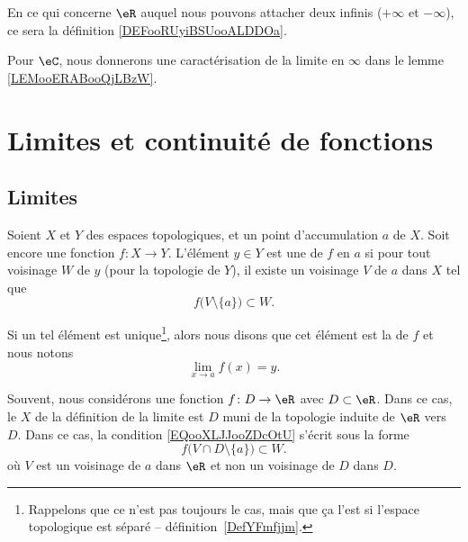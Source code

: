 En ce qui concerne \( \eR\) auquel nous pouvons attacher deux infinis (\( +\infty\) et \( -\infty\)), ce sera la définition \ref{DEFooRUyiBSUooALDDOa}.

Pour \( \eC\), nous donnerons une caractérisation de la limite en \( \infty\) dans le lemme \ref{LEMooERABooQjLBzW}.

\section{Limites et continuité de fonctions}

\subsection{Limites}

\begin{definition}\label{DefYNVoWBx}
    Soient \( X\) et \( Y\) des espaces topologiques, et un point d'accumulation \( a\) de \( X\). Soit encore une fonction \( f\colon X\to Y\). L'élément \( y\in Y\) est une  de \( f\) en \( a\) si pour tout voisinage \( W\) de \( y\) (pour la topologie de \( Y\)), il existe un voisinage \( V\) de \( a\) dans \( X\) tel que
    \begin{equation}        \label{EQooXLJJooZDcOtU}
        f\big( V\setminus\{a\} \big)\subset W.
    \end{equation}

    Si un tel élément est unique\footnote{Rappelons que ce n'est pas toujours le cas, mais que ça l'est si l'espace topologique est séparé -- définition~\ref{DefYFmfjjm}.}, alors nous disons que cet élément est la  de \( f\) et nous notons
    \begin{equation}
        \lim_{x\to a} f(x)=y.
    \end{equation}
\end{definition}

\begin{normaltext}
    Souvent, nous considérons une fonction \( f\colon D\to \eR\) avec \( D\subset \eR\). Dans ce cas, le \( X\) de la définition de la limite est \( D\) muni de la topologie induite de \( \eR\) vers \( D\). Dans ce cas, la condition \eqref{EQooXLJJooZDcOtU} s'écrit sous la forme
    \begin{equation}
        f\big( V\cap D\setminus\{a\} \big)\subset W.
    \end{equation}
    où \( V\) est un voisinage de \( a\) dans \( \eR\) et non un voisinage de \( D\) dans \( D\).
\end{normaltext}


